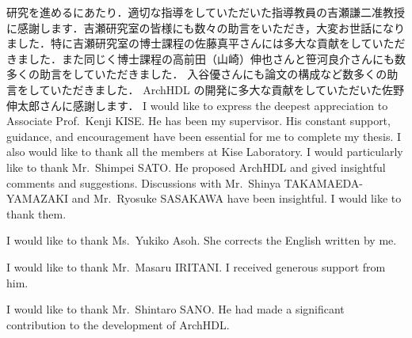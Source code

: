 研究を進めるにあたり．適切な指導をしていただいた指導教員の吉瀬謙二准教授に感謝します．吉瀬研究室の皆様にも数々の助言をいただき，大変お世話になりました．特に吉瀬研究室の博士課程の佐藤真平さんには多大な貢献をしていただきました．また同じく博士課程の高前田（山崎）伸也さんと笹河良介さんにも数多くの助言をしていただきました．
入谷優さんにも論文の構成など数多くの助言をしていただきました．
ArchHDL の開発に多大な貢献をしていただいた佐野伸太郎さんに感謝します．
\fi
I would like to express the deepest appreciation to Associate Prof.~Kenji KISE.\@
He has been my supervisor. His constant support, guidance, and encouragement have been essential for me to complete my thesis.
I also would like to thank all the members at Kise Laboratory.
I would particularly like to thank Mr.~Shimpei SATO.\@
He proposed ArchHDL and gived insightful comments and suggestions.
Discussions with Mr.~Shinya TAKAMAEDA-YAMAZAKI and Mr.~Ryosuke SASAKAWA have been insightful. I would like to thank them.

I would like to thank Ms.~Yukiko Asoh.\@
She corrects the English written by me.

I would like to thank Mr.~Masaru IRITANI.\@
I received generous support from him.

I would like to thank Mr.~Shintaro SANO.\@
He had made a significant contribution to the development of ArchHDL.
